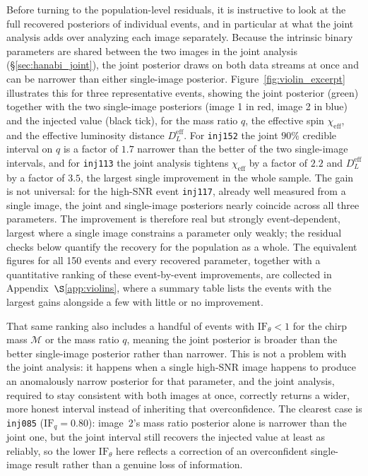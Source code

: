 Before turning to the population-level residuals, it is instructive to look at the full recovered posteriors of individual events, and in particular at what the joint analysis adds over analyzing each image separately. Because the intrinsic binary parameters are shared between the two images in the joint analysis (\S\ref{sec:hanabi_joint}), the joint posterior draws on both data streams at once and can be narrower than either single-image posterior. Figure~\ref{fig:violin_excerpt} illustrates this for three representative events, showing the joint posterior (green) together with the two single-image posteriors (image 1 in red, image 2 in blue) and the injected value (black tick), for the mass ratio $q$, the effective spin $\chi_\mathrm{eff}$, and the effective luminosity distance $D_L^{\mathrm{eff}}$. For \texttt{inj152} the joint $90\%$ credible interval on $q$ is a factor of $1.7$ narrower than the better of the two single-image intervals, and for \texttt{inj113} the joint analysis tightens $\chi_\mathrm{eff}$ by a factor of $2.2$ and $D_L^{\mathrm{eff}}$ by a factor of $3.5$, the largest single improvement in the whole sample. The gain is not universal: for the high-SNR event \texttt{inj117}, already well measured from a single image, the joint and single-image posteriors nearly coincide across all three parameters. The improvement is therefore real but strongly event-dependent, largest where a single image constrains a parameter only weakly; the residual checks below quantify the recovery for the population as a whole. The equivalent figures for all 150 events and every recovered parameter, together with a quantitative ranking of these event-by-event improvements, are collected in Appendix~$\S$\ref{app:violins}, where a summary table lists the events with the largest gains alongside a few with little or no improvement.

That same ranking also includes a handful of events with $\mathrm{IF}_\theta<1$ for the chirp mass $\mathcal{M}$ or the mass ratio $q$, meaning the joint posterior is broader than the better single-image posterior rather than narrower. This is not a problem with the joint analysis: it happens when a single high-SNR image happens to produce an anomalously narrow posterior for that parameter, and the joint analysis, required to stay consistent with both images at once, correctly returns a wider, more honest interval instead of inheriting that overconfidence. The clearest case is \texttt{inj085} ($\mathrm{IF}_q=0.80$): image~2's mass ratio posterior alone is narrower than the joint one, but the joint interval still recovers the injected value at least as reliably, so the lower $\mathrm{IF}_\theta$ here reflects a correction of an overconfident single-image result rather than a genuine loss of information.

